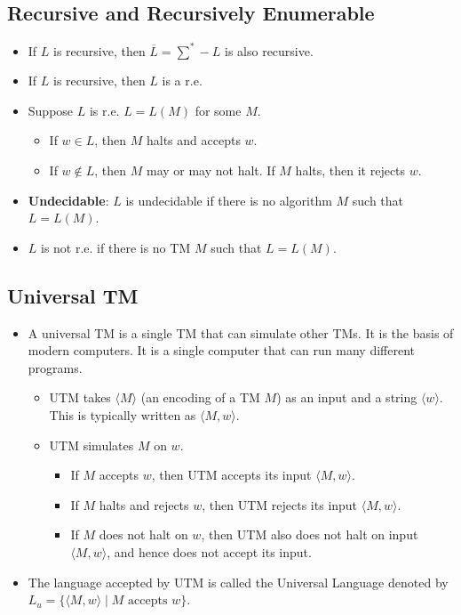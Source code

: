 \subsection{Recursive and Recursively Enumerable}
\begin{itemize}
    \item If $L$ is recursive, then $\overline{L} = \sum^\ast - L$ is also recursive.
    \item If $L$ is recursive, then $L$ is a r.e.
    \item Suppose $L$ is r.e. $L = L(M)$ for some $M$.
    \begin{itemize}
        \item If $w \in L$, then $M$ halts and accepts $w$.
        \item If $w \notin L$, then $M$ may or may not halt. If $M$ halts, then it rejects $w$.
    \end{itemize}
    \item \textbf{Undecidable}: $L$ is undecidable if there is no algorithm $M$ such that $L = L(M)$.
    \item $L$ is not r.e. if there is no TM $M$ such that $L = L(M)$.
\end{itemize}

\subsection{Universal TM}
\begin{itemize}
    \item A universal TM is a single TM that can simulate other TMs. It is the basis of modern computers. It is a single computer that can run many different programs.
    \begin{itemize}
        \item UTM takes $\langle M \rangle$ (an encoding of a TM $M$) as an input and a string $\langle w \rangle$. This is typically written as $\langle M, w \rangle$.
        \item UTM simulates $M$ on $w$.
        \begin{itemize}
            \item If $M$ accepts $w$, then UTM accepts its input $\langle M, w \rangle$.
            \item If $M$ halts and rejects $w$, then UTM rejects its input $\langle M, w \rangle$.
            \item If $M$ does not halt on $w$, then UTM also does not halt on input $\langle M, w \rangle$, and hence does not accept its input.
        \end{itemize}
    \end{itemize}
    \item The language accepted by UTM is called the Universal Language denoted by $L_u = \{ \langle M, w \rangle \mid \text{$M$ accepts $w$} \}$.
\end{itemize}

